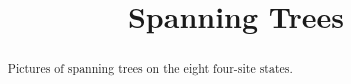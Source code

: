 \documentclass{xourse}
\title{Spanning Trees}
\begin{document}
\begin{abstract}
Pictures of spanning trees on the eight four-site states.
\end{abstract}
\maketitle

\end{document}

